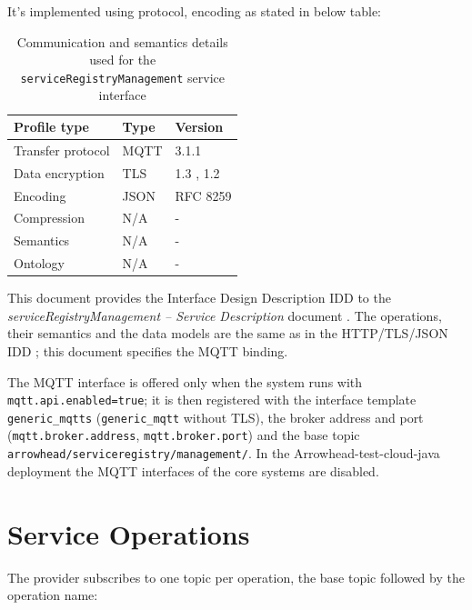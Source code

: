 \documentclass[a4paper]{arrowhead}
\begin{document}
It's implemented using protocol, encoding as stated in below table:
\begin{table}[ht!]
  \centering
  \begin{tabular}{|l|l|l|}
    \hline
    \rowcolor{gray!33} Profile type & Type & Version \\ \hline
    Transfer protocol & MQTT & 3.1.1 \cite{mqtt311} \\ \hline
    Data encryption & TLS & 1.3 \cite{rfc8446}, 1.2 \cite{rfc5246} \\ \hline
    Encoding & JSON & RFC 8259 \cite{rfc8259} \\ \hline
    Compression & N/A & - \\ \hline
    Semantics & N/A & - \\ \hline
    Ontology & N/A & - \\ \hline
  \end{tabular}
  \caption{Communication and semantics details used for the \texttt{service\allowbreak{}Registry\allowbreak{}Management} service interface}
  \label{tab:comunication_semantics_profile}
\end{table}

This document provides the Interface Design Description IDD to the \textit{serviceRegistryManagement -- Service Description} document \cite{sr-serviceRegistryManagement-sd}.
The operations, their semantics and the data models are the same as in the HTTP/TLS/JSON IDD \cite{sr-serviceRegistryManagement-http-idd}; this document specifies the MQTT binding.

The MQTT interface is offered only when the system runs with \texttt{mqtt.api.enabled=true}; it is then registered with the interface template \texttt{generic\_\allowbreak{}mqtts} (\texttt{generic\_\allowbreak{}mqtt} without TLS), the broker address and port (\texttt{mqtt.\allowbreak{}broker.\allowbreak{}address}, \texttt{mqtt.\allowbreak{}broker.\allowbreak{}port}) and the base topic \texttt{arrowhead/\allowbreak{}serviceregistry/\allowbreak{}management/\allowbreak{}}. In the Arrowhead-test-cloud-java deployment the MQTT interfaces of the core systems are disabled.

\newpage

\section{Service Operations}
\label{sec:operations}

The provider subscribes to one topic per operation, the base topic followed by the operation name:
\end{document}
